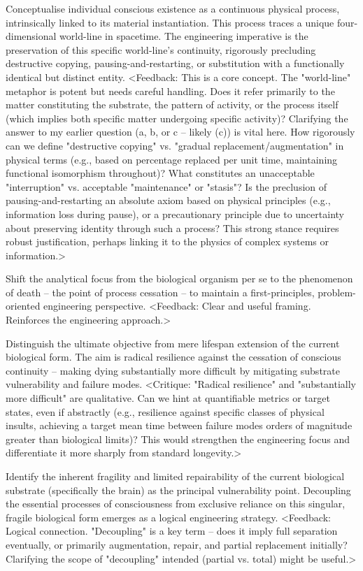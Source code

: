 \documentclass[10pt]{article}
\begin{document}
\begin{sloppypar}
  Conceptualise individual conscious existence as a continuous physical process, intrinsically linked to its material instantiation. This process traces a unique four-dimensional world-line in spacetime. The engineering imperative is the preservation of this specific world-line's continuity, rigorously precluding destructive copying, pausing-and-restarting, or substitution with a functionally identical but distinct entity. <Feedback: This is a core concept. The "world-line" metaphor is potent but needs careful handling. Does it refer primarily to the matter constituting the substrate, the pattern of activity, or the process itself (which implies both specific matter undergoing specific activity)? Clarifying the answer to my earlier question (a, b, or c – likely (c)) is vital here. How rigorously can we define "destructive copying" vs. "gradual replacement/augmentation" in physical terms (e.g., based on percentage replaced per unit time, maintaining functional isomorphism throughout)? What constitutes an unacceptable "interruption" vs. acceptable "maintenance" or "stasis"? Is the preclusion of pausing-and-restarting an absolute axiom based on physical principles (e.g., information loss during pause), or a precautionary principle due to uncertainty about preserving identity through such a process? This strong stance requires robust justification, perhaps linking it to the physics of complex systems or information.>

  Shift the analytical focus from the biological organism per se to the phenomenon of death – the point of process cessation – to maintain a first-principles, problem-oriented engineering perspective. <Feedback: Clear and useful framing. Reinforces the engineering approach.>

  Distinguish the ultimate objective from mere lifespan extension of the current biological form. The aim is radical resilience against the cessation of conscious continuity – making dying substantially more difficult by mitigating substrate vulnerability and failure modes. <Critique: "Radical resilience" and "substantially more difficult" are qualitative. Can we hint at quantifiable metrics or target states, even if abstractly (e.g., resilience against specific classes of physical insults, achieving a target mean time between failure modes orders of magnitude greater than biological limits)? This would strengthen the engineering focus and differentiate it more sharply from standard longevity.>

  Identify the inherent fragility and limited repairability of the current biological substrate (specifically the brain) as the principal vulnerability point. Decoupling the essential processes of consciousness from exclusive reliance on this singular, fragile biological form emerges as a logical engineering strategy. <Feedback: Logical connection. "Decoupling" is a key term – does it imply full separation eventually, or primarily augmentation, repair, and partial replacement initially? Clarifying the scope of "decoupling" intended (partial vs. total) might be useful.>


\end{sloppypar}
\end{document}
